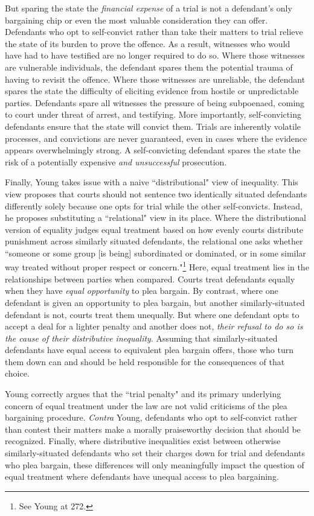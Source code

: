 But sparing the state the \textit{financial expense} of a trial is not a defendant's only bargaining chip or even the most valuable consideration they can offer. Defendants who opt to self-convict rather than take their matters to trial relieve the state of its burden to prove the offence. As a result, witnesses who would have had to have testified are no longer required to do so. Where those witnesses are vulnerable individuals, the defendant spares them the potential trauma of having to revisit the offence. Where those witnesses are unreliable, the defendant spares the state the difficulty of eliciting evidence from hostile or unpredictable parties. Defendants spare all witnesses the pressure of being subpoenaed, coming to court under threat of arrest, and testifying. More importantly, self-convicting defendants ensure that the state will convict them. Trials are inherently volatile processes, and convictions are never guaranteed, even in cases where the evidence appears overwhelmingly strong. A self-convicting defendant spares the state the risk of a potentially expensive \textit{and unsuccessful} prosecution.

Finally, Young takes issue with a naive ``distributional" view of inequality. This view proposes that courts should not sentence two identically situated defendants differently solely because one opts for trial while the other self-convicts. Instead, he proposes substituting a ``relational" view in its place. Where the distributional version of equality judges equal treatment based on how evenly courts distribute punishment across similarly situated defendants, the relational one asks whether ``someone or some group [is being] subordinated or dominated, or in some similar way treated without proper respect or concern."\footnote{See Young at 272.} Here, equal treatment lies in the relationships between parties when compared. Courts treat defendants equally when they have \textit{equal opportunity} to plea bargain. By contrast, where one defendant is given an opportunity to plea bargain, but another similarly-situated defendant is not, courts treat them unequally. But where one defendant opts to accept a deal for a lighter penalty and another does not, \textit{their refusal to do so is the cause of their distributive inequality}. Assuming that similarly-situated defendants have equal access to equivalent plea bargain offers, those who turn them down can and should be held responsible for the consequences of that choice.

Young correctly argues that the ``trial penalty" and its primary underlying concern of equal treatment under the law are not valid criticisms of the plea bargaining procedure. \textit{Contra} Young, defendants who opt to self-convict rather than contest their matters make a morally praiseworthy decision that should be recognized. Finally, where distributive inequalities exist between otherwise similarly-situated defendants who set their charges down for trial and defendants who plea bargain, these differences will only meaningfully impact the question of equal treatment where defendants have unequal access to plea bargaining. 

